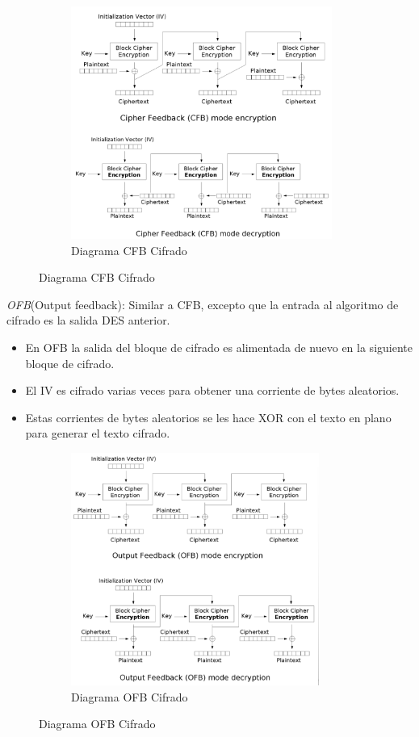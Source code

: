 \begin{figure}[h]
    \centering
    \begin{subfigure}[t]{0.5\textwidth}
        \centering
        \includegraphics[height=3in]{./images/CFB.png}
        \caption{Diagrama CFB Cifrado}
        \label{fig:1-3-1}
    \end{subfigure}
\end{figure}
\pagebreak

\textit{OFB}(Output feedback): Similar a CFB, excepto que la entrada al algoritmo de cifrado es la salida DES anterior.\\
\begin{itemize}
	\item En OFB la salida del bloque de cifrado es alimentada de nuevo en la siguiente bloque de cifrado.
	\item El IV es cifrado varias veces para obtener una corriente de bytes aleatorios.
	\item Estas corrientes de bytes aleatorios se les hace XOR con el texto en plano para generar el texto cifrado.
\end{itemize}

\begin{figure}[h]
    \centering
    \begin{subfigure}[t]{0.5\textwidth}
        \centering
        \includegraphics[height=3in]{./images/OFB.png}
        \caption{Diagrama OFB Cifrado}
        \label{fig:1-3-1}
    \end{subfigure}
\end{figure}
\pagebreak

